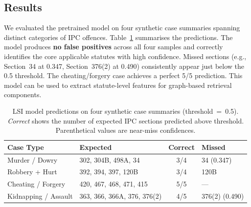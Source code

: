 \documentclass[11pt]{article}
\begin{document}
\subsection{Results}

We evaluated the pretrained model on four synthetic case summaries spanning distinct categories of IPC offences.
Table~\ref{tab:lsi} summarises the predictions.
The model produces \textbf{no false positives} across all four samples and correctly identifies the core applicable statutes with high confidence.
Missed sections (e.g., Section~34 at 0.347, Section~376(2) at 0.490) consistently appear just below the 0.5 threshold.
The cheating/forgery case achieves a perfect 5/5 prediction.
This model can be used to extract statute-level features for graph-based retrieval components.

\begin{table}[htbp]
\centering
\footnotesize
\setlength{\tabcolsep}{3pt}
\begin{tabular}{@{}llcl@{}}
\toprule
\textbf{Case Type} & \textbf{Expected} & \textbf{Correct} & \textbf{Missed} \\
\midrule
Murder / Dowry   & 302, 304B, 498A, 34    & 3/4 & 34 (0.347) \\
Robbery + Hurt   & 392, 394, 397, 120B    & 3/4 & 120B \\
Cheating / Forgery & 420, 467, 468, 471, 415 & 5/5 & --- \\
Kidnapping / Assault & 363, 366, 366A, 376, 376(2) & 4/5 & 376(2) (0.490) \\
\bottomrule
\end{tabular}
\caption{LSI model predictions on four synthetic case summaries (threshold~=~0.5). \emph{Correct} shows the number of expected IPC sections predicted above threshold. Parenthetical values are near-miss confidences.}
\label{tab:lsi}
\end{table}
\end{document}
